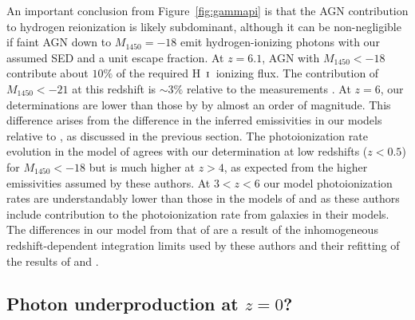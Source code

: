 \documentclass[fleqn,usenatbib]{mnras}
\def\HI{\hbox{H~$\scriptstyle\rm I$}}
\begin{document}
An important conclusion from Figure~\ref{fig:gammapi} is that the AGN
contribution to hydrogen reionization is likely subdominant, although
it can be non-negligible if faint AGN down to $M_{1450}=-18$ emit
hydrogen-ionizing photons with our assumed SED and a unit escape
fraction.  At $z=6.1$, AGN with $M_{1450}<-18$ contribute about $10\%$
of the required \HI\ ionizing flux.  The contribution of
$M_{1450}<-21$ at this redshift is $\sim 3\%$ relative to the
measurements \citep{2011MNRAS.412.2543C, 2018MNRAS.473..560D,
  2018ApJ...855..106D}.  At $z=6$, our determinations are lower than
those by \citet{2015AA...578A..83G} by almost an order of magnitude.
This difference arises from the difference in the inferred
emissivities in our models relative to \citet{2015AA...578A..83G}, as
discussed in the previous section.  The photoionization rate evolution
in the model of \citet{2015ApJ...813L...8M} agrees with our
determination at low redshifts ($z<0.5$) for $M_{1450}<-18$ but is
much higher at $z>4$, as expected from the higher emissivities assumed
by these authors.  At $3<z<6$ our model photoionization rates are
understandably lower than those in the models of
\citet{2017ApJ...837..106O} and \citet{2018arXiv180104931P} as these
authors include contribution to the photoionization rate from galaxies
in their models.  The differences in our model from that of
\citet{2015MNRAS.451L..30K} are a result of the inhomogeneous
redshift-dependent integration limits used by these authors and their
refitting of the results of \citet{2009MNRAS.392...19C} and
\citet{2013A&A...551A..29P}.

\subsection{Photon underproduction at $z=0$?}
\end{document}

